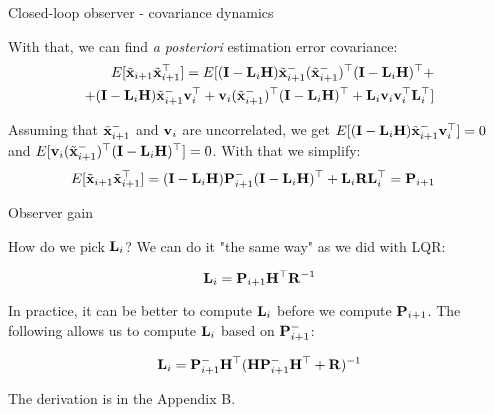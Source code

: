 \documentclass{beamer}
\begin{document}
\begin{frame}{Closed-loop observer - covariance dynamics}
	\begin{flushleft}
		
		
		With that, we can find \emph{a posteriori} estimation error covariance:
		\begin{align*}
			E[\Tilde{\mathbf{x}}_{i+1} \Tilde{\mathbf{x}}_{i+1}^\top] 
			=
			E[ (\mathbf{I} - \mathbf{L}_i \mathbf{H}) \Tilde{\mathbf{x}}_{i+1}^- (\Tilde{\mathbf{x}}_{i+1}^-)^\top (\mathbf{I} - \mathbf{L}_i \mathbf{H})^\top + \\
			+(\mathbf{I} - \mathbf{L}_i \mathbf{H}) \Tilde{\mathbf{x}}_{i+1}^- \mathbf{v}_i^\top +
			\mathbf{v}_i (\Tilde{\mathbf{x}}_{i+1}^-)^\top (\mathbf{I} - \mathbf{L}_i \mathbf{H})^\top +
			\mathbf{L}_i \mathbf{v}_i \mathbf{v}_i^\top \mathbf{L}_i^\top]
		\end{align*}
		
		Assuming that $\Tilde{\mathbf{x}}_{i+1}^-$ and $\mathbf{v}_i$ are uncorrelated, we get $E[(\mathbf{I} - \mathbf{L}_i \mathbf{H}) \Tilde{\mathbf{x}}_{i+1}^- \mathbf{v}_i^\top] = 0$ and $E[\mathbf{v}_i (\Tilde{\mathbf{x}}_{i+1}^-)^\top (\mathbf{I} - \mathbf{L}_i \mathbf{H})^\top] = 0$. With that we simplify:
		\begin{align*}
			E[\Tilde{\mathbf{x}}_{i+1} \Tilde{\mathbf{x}}_{i+1}^\top] 
			&=
			(\mathbf{I} - \mathbf{L}_i \mathbf{H}) \mathbf{P}_{i+1}^- (\mathbf{I} - \mathbf{L}_i \mathbf{H})^\top +\mathbf{L}_i\mathbf{R}\mathbf{L}_i^\top = \mathbf{P}_{i+1}
		\end{align*}
		
	\end{flushleft}
\end{frame}



\begin{frame}{Observer gain}
	\begin{flushleft}
		
		How do we pick $\mathbf{L}_i$? We can do it "the same way" as we did with LQR:
		
		\begin{equation}
			\mathbf{L}_i = \mathbf{P}_{i+1} \mathbf{H}^\top \mathbf{R}^{-1}
		\end{equation}
	
		In practice, it can be better to compute $\mathbf{L}_i$ before we compute $\mathbf{P}_{i+1}$. The following allows us to compute $\mathbf{L}_i$ based on $\mathbf{P}_{i+1}^-$:
		
		\begin{equation}
			\mathbf{L}_i = \mathbf{P}_{i+1}^- \mathbf{H}^\top (\mathbf{H} \mathbf{P}_{i+1}^- \mathbf{H}^\top + \mathbf{R})^{-1}
		\end{equation}
	
		The derivation is in the Appendix B.
	
	
	\end{flushleft}
\end{frame}
\end{document}
